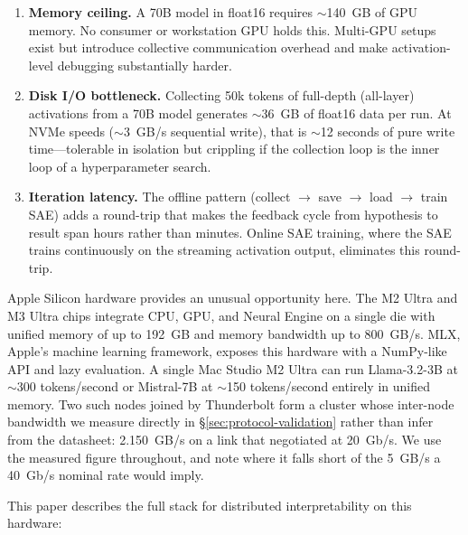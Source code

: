 \documentclass[11pt]{article}
\begin{document}
\begin{enumerate}
\item \textbf{Memory ceiling.} A 70B model in float16 requires $\sim$140~GB of GPU memory. No consumer or workstation GPU holds this. Multi-GPU setups exist but introduce collective communication overhead and make activation-level debugging substantially harder.

\item \textbf{Disk I/O bottleneck.} Collecting 50k tokens of full-depth (all-layer) activations from a 70B model generates $\sim$36~GB of float16 data per run. At NVMe speeds ($\sim$3~GB/s sequential write), that is $\sim$12 seconds of pure write time---tolerable in isolation but crippling if the collection loop is the inner loop of a hyperparameter search.

\item \textbf{Iteration latency.} The offline pattern (collect $\to$ save $\to$ load $\to$ train SAE) adds a round-trip that makes the feedback cycle from hypothesis to result span hours rather than minutes. Online SAE training, where the SAE trains continuously on the streaming activation output, eliminates this round-trip.
\end{enumerate}

Apple Silicon hardware provides an unusual opportunity here. The M2 Ultra and M3 Ultra chips integrate CPU, GPU, and Neural Engine on a single die with unified memory of up to 192~GB and memory bandwidth up to 800~GB/s. MLX, Apple's machine learning framework, exposes this hardware with a NumPy-like API and lazy evaluation. A single Mac Studio M2 Ultra can run Llama-3.2-3B at $\sim$300 tokens/second or Mistral-7B at $\sim$150 tokens/second entirely in unified memory. Two such nodes joined by Thunderbolt form a cluster whose inter-node bandwidth we measure directly in \S\ref{sec:protocol-validation} rather than infer from the datasheet: 2.150~GB/s on a link that negotiated at 20~Gb/s. We use the measured figure throughout, and note where it falls short of the 5~GB/s a 40~Gb/s nominal rate would imply.

This paper describes the full stack for distributed interpretability on this hardware:
\end{document}

